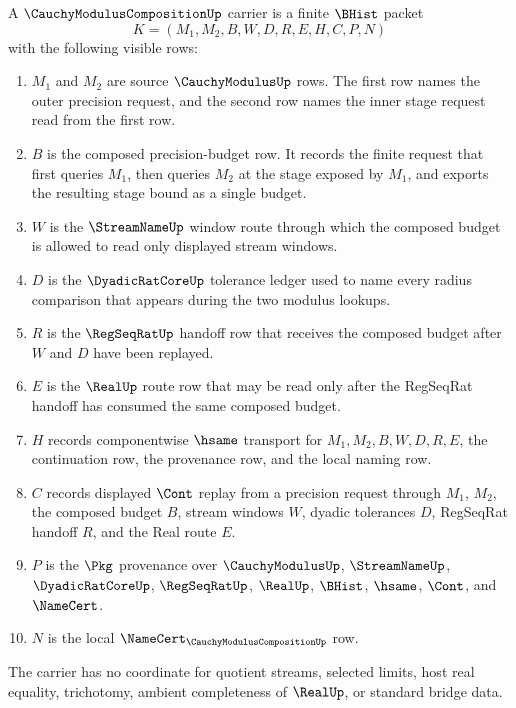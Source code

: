 \begin{definition}
\label{def:cauchy-modulus-composition-carrier}
A $\CauchyModulusCompositionUp$ carrier is a finite $\BHist$ packet
$$
K=(M_1,M_2,B,W,D,R,E,H,C,P,N)
$$
with the following visible rows:
\begin{enumerate}
\item $M_1$ and $M_2$ are source $\CauchyModulusUp$ rows. The first row names the outer precision request, and the second row names the inner stage request read from the first row.
\item $B$ is the composed precision-budget row. It records the finite request that first queries $M_1$, then queries $M_2$ at the stage exposed by $M_1$, and exports the resulting stage bound as a single budget.
\item $W$ is the $\StreamNameUp$ window route through which the composed budget is allowed to read only displayed stream windows.
\item $D$ is the $\DyadicRatCoreUp$ tolerance ledger used to name every radius comparison that appears during the two modulus lookups.
\item $R$ is the $\RegSeqRatUp$ handoff row that receives the composed budget after $W$ and $D$ have been replayed.
\item $E$ is the $\RealUp$ route row that may be read only after the RegSeqRat handoff has consumed the same composed budget.
\item $H$ records componentwise $\hsame$ transport for $M_1,M_2,B,W,D,R,E$, the continuation row, the provenance row, and the local naming row.
\item $C$ records displayed $\Cont$ replay from a precision request through $M_1$, $M_2$, the composed budget $B$, stream windows $W$, dyadic tolerances $D$, RegSeqRat handoff $R$, and the Real route $E$.
\item $P$ is the $\Pkg$ provenance over $\CauchyModulusUp$, $\StreamNameUp$, $\DyadicRatCoreUp$, $\RegSeqRatUp$, $\RealUp$, $\BHist$, $\hsame$, $\Cont$, and $\NameCert$.
\item $N$ is the local $\NameCert_{\CauchyModulusCompositionUp}$ row.
\end{enumerate}
The carrier has no coordinate for quotient streams, selected limits, host real equality, trichotomy, ambient completeness of $\RealUp$, or standard bridge data.
\end{definition}

